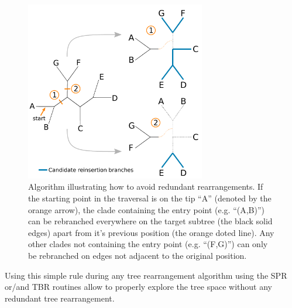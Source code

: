 \documentclass[12pt,letterpaper]{article}
\begin{document}
\begin{figure}[!htbp]
\centering
   \includegraphics[width=0.7\textwidth]{Figure/Figure_Neighbour.pdf}
\caption{Algorithm illustrating how to avoid redundant rearrangements. If the starting point in the traversal is on the tip ``A'' (denoted by the orange arrow), the clade containing the entry point (e.g. ``(A,B)'') can be rebranched everywhere on the target subtree (the black solid edges) apart from it's previous position (the orange doted line). Any other clades not containing the entry point (e.g. ``(F,G)'') can only be rebranched on edges not adjacent to the original position.}
\label{Figure_Neighbor}
\end{figure}

Using this simple rule during any tree rearrangement algorithm using the SPR or/and TBR routines allow to properly explore the tree space \citep[i.e. the correct number of topologies are visited, following][]{allen2001subtree} without any redundant tree rearrangement.








\end{document}
